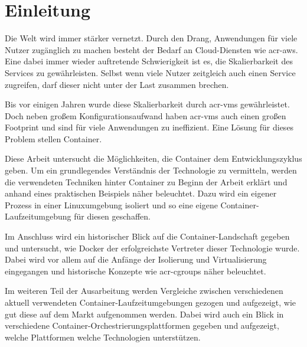 \chapter{Einleitung}
\label{chap:einleitung}
Die Welt wird immer stärker vernetzt. Durch den Drang, Anwendungen für viele Nutzer zugänglich zu machen besteht der Bedarf an Cloud-Diensten wie \gls{acr-aws}.
Eine dabei immer wieder auftretende Schwierigkeit ist es, die Skalierbarkeit des Services zu gewährleisten. Selbst wenn viele Nutzer zeitgleich auch einen Service zugreifen, darf dieser nicht unter der Last zusammen brechen.

Bis vor einigen Jahren wurde diese Skalierbarkeit durch \glspl{acr-vm} gewährleistet. Doch neben großem Konfigurationsaufwand haben \glspl{acr-vm} auch einen großen Footprint und sind für viele  Anwendungen zu ineffizient. Eine Lösung für dieses Problem stellen Container.

Diese Arbeit untersucht die Möglichkeiten, die Container dem Entwicklungszyklus geben. Um ein grundlegendes Verständnis der Technologie zu vermitteln, werden die verwendeten Techniken hinter Container zu Beginn der Arbeit erklärt und anhand eines praktischen Beispiels näher beleuchtet. Dazu wird ein eigener Prozess in einer Linuxumgebung isoliert und so eine eigene Container-Laufzeitumgebung für diesen geschaffen.

Im Anschluss wird ein historischer Blick auf die Container-Landschaft gegeben und untersucht, wie Docker der erfolgreichste Vertreter dieser Technologie wurde. Dabei wird vor allem auf die Anfänge der Isolierung und Virtualisierung eingegangen und historische Konzepte wie \glspl{acr-cgroup} näher beleuchtet.

Im weiteren Teil der Ausarbeitung werden Vergleiche zwischen verschiedenen aktuell verwendeten Container-Laufzeitumgebungen gezogen und aufgezeigt, wie gut diese auf dem Markt aufgenommen werden. Dabei wird auch ein Blick in verschiedene Container-Orchestrierungsplattformen gegeben und aufgezeigt, welche Plattformen welche Technologien unterstützen.

